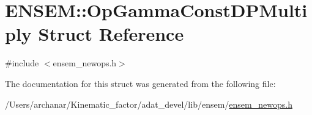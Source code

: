 \hypertarget{structENSEM_1_1OpGammaConstDPMultiply}{}\section{E\+N\+S\+EM\+:\+:Op\+Gamma\+Const\+D\+P\+Multiply Struct Reference}
\label{structENSEM_1_1OpGammaConstDPMultiply}


{\ttfamily \#include $<$ensem\+\_\+newops.\+h$>$}



The documentation for this struct was generated from the following file\+:\begin{DoxyCompactItemize}
\item 
/\+Users/archanar/\+Kinematic\+\_\+factor/adat\+\_\+devel/lib/ensem/\mbox{\hyperlink{lib_2ensem_2ensem__newops_8h}{ensem\+\_\+newops.\+h}}\end{DoxyCompactItemize}
